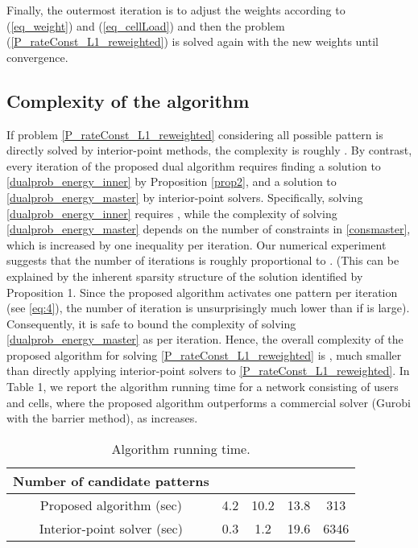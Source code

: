 \documentclass{article}
\begin{document}
Finally, the outermost iteration is to adjust the weights according to
(\ref{eq_weight}) and (\ref{eq_cellLoad}) and then the problem
(\ref{P_rateConst_L1_reweighted}) is solved again with the new
weights until convergence.

\subsection{Complexity of the algorithm}
\label{sec:complexity-algorithm}

If problem \eqref{P_rateConst_L1_reweighted} considering all possible
pattern is directly solved by interior-point methods, the complexity
is roughly . By contrast, every iteration of
the proposed dual algorithm requires finding a solution to
\eqref{dualprob_energy_inner} by Proposition \ref{prop2}, and a
solution to \eqref{dualprob_energy_master} by interior-point
solvers. Specifically, solving \eqref{dualprob_energy_inner} requires
, while the complexity of solving
\eqref{dualprob_energy_master} depends on the number of constraints in
\eqref{consmaster}, which is increased by one inequality per
iteration. Our numerical experiment suggests that the number of iterations
is roughly proportional to . (This can be explained by the inherent
sparsity structure of the solution identified by Proposition 1. Since
the proposed algorithm activates one pattern per iteration (see
\eqref{eq:4}), the number of iteration is unsurprisingly much lower
than  if  is large). Consequently, it is safe to bound the
complexity of solving \eqref{dualprob_energy_master} as
 per iteration. Hence, the overall complexity of the
proposed algorithm for solving \eqref{P_rateConst_L1_reweighted} is
, much smaller than directly applying
interior-point solvers to \eqref{P_rateConst_L1_reweighted}. In Table
1, we report the algorithm running time for a network consisting of
 users and  cells, where the proposed algorithm outperforms a
commercial solver (Gurobi \cite{Gurobi} with the barrier method), as
 increases.


\begin{table}[t]
\footnotesize
\renewcommand{\arraystretch}{1.0}
\caption{Algorithm running time. }
\label{tab:runTime}
\centering
\begin{tabular}{|c | c | c | c |c | }
\hline
Number of candidate patterns &    &     &    &    \\
\hline
\hline
Proposed algorithm (sec) & 4.2   & 10.2 & 13.8 & 313  \\
\hline
Interior-point solver (sec)  &  0.3 & 1.2  & 19.6 & 6346 \\
\hline \end{tabular}
\end{table}
\end{document}
